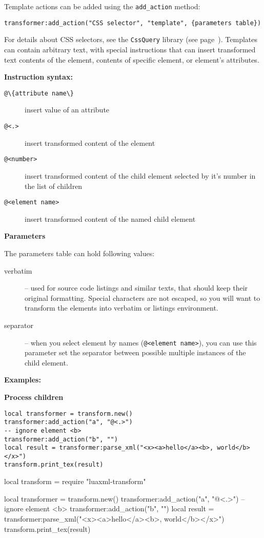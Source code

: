 \documentclass{ltxdoc}
\begin{document}
Template actions can be added using the \verb|add_action| method:

\begin{verbatim}
transformer:add_action("CSS selector", "template", {parameters table})
\end{verbatim}

For details about CSS selectors, see the \texttt{CssQuery} library 
(see page~\pageref{sec:cssquery_library}). Templates can contain 
arbitrary text, with special instructions that can insert transformed
text contents of the element, contents of specific element, or element's
attributes.


\noindent\textbf{Instruction syntax:}

\begin{description}
  \item[\verb|@\{attribute name\}|] insert value of an attribute
  \item[\verb|@<.>|] insert transformed content of the element
  \item[\verb|@<number>|] insert transformed content of the child element
    selected by it's number in the list of children
  \item[\verb|@<element name>|] insert transformed content of the named child element
\end{description}

\noindent\textbf{Parameters}

The parameters table can hold following values:

\begin{description}
  \item[verbatim] -- used for source code listings and similar texts, that should keep their original formatting. 
    Special characters are not escaped, so you will want to transform the elements into verbatim or listings environment.
  \item[separator] -- when you select element by names (\verb|@<element name>|), you can use this parameter
    set the separator between possible multiple instances of the child element.
\end{description}

\noindent\textbf{Examples:}

\noindent\textbf{Process children}

\begin{verbatim}
local transformer = transform.new()
transformer:add_action("a", "@<.>")
-- ignore element <b>
transformer:add_action("b", "")
local result = transformer:parse_xml("<x><a>hello</a><b>, world</b></x>")
transform.print_tex(result)
\end{verbatim}
\begin{framed}
\begin{luacode*}

local transform = require "luaxml-transform"

local transformer = transform.new()
transformer:add_action("a", "@<.>")
-- ignore element <b>
transformer:add_action("b", "")
local result = transformer:parse_xml("<x><a>hello</a><b>, world</b></x>")
transform.print_tex(result)
\end{luacode*}
\end{framed}
\end{document}

